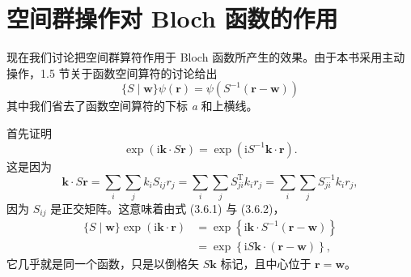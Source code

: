 \section{空间群操作对 Bloch 函数的作用}

现在我们讨论把空间群算符作用于 Bloch 函数所产生的效果。由于本书采用主动操作，1.5 节关于函数空间算符的讨论给出
\begin{equation*}
\{S \mid \mathbf{w}\}\psi(\mathbf{r}) = \psi(S^{-1}(\mathbf{r} - \mathbf{w}))
\tag{3.6.1}
\end{equation*}
其中我们省去了函数空间算符的下标 \textit{a} 和上横线。

首先证明
\begin{equation*}
\exp(\mathrm{i}\mathbf{k} \cdot S\mathbf{r}) = \exp(\mathrm{i}S^{-1}\mathbf{k} \cdot \mathbf{r}).
\tag{3.6.2}
\end{equation*}
这是因为
\begin{equation*}
\mathbf{k} \cdot S\mathbf{r} = \sum_{i}\sum_{j}k_{i}S_{ij}r_{j} = \sum_{i}\sum_{j}S^{\mathrm{T}}_{ji}k_{i}r_{j} = \sum_{i}\sum_{j}S^{-1}_{ji}k_{i}r_{j},
\tag{3.6.3}
\end{equation*}
因为 $S_{ij}$ 是正交矩阵。这意味着由式 (3.6.1) 与 (3.6.2)，
\begin{equation*}
\begin{aligned}
\{S \mid \mathbf{w}\}\exp(\mathrm{i}\mathbf{k} \cdot \mathbf{r}) &= \exp\left\{\mathrm{i}\mathbf{k} \cdot S^{-1}(\mathbf{r} - \mathbf{w})\right\}\\
&= \exp\left\{\mathrm{i}S\mathbf{k} \cdot (\mathbf{r} - \mathbf{w})\right\},
\end{aligned}
\tag{3.6.4}
\end{equation*}
它几乎就是同一个函数，只是以倒格矢 $S\mathbf{k}$ 标记，且中心位于 $\mathbf{r} = \mathbf{w}$。


